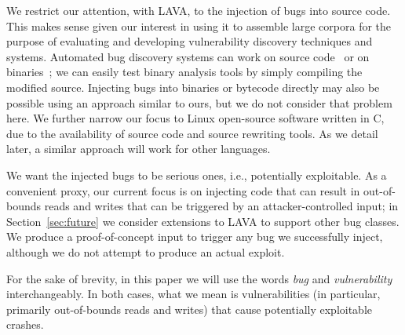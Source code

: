 
We restrict our attention, with LAVA, to the injection of bugs into source code.
This makes sense given our interest in using it to assemble large corpora for the purpose of evaluating and developing vulnerability discovery techniques and systems.
Automated bug discovery systems can work on source
code~\cite{Cadar:2008, Ganesh:2009, Haller:2013, Yamaguchi:2014} or on
binaries~\cite{Cha:2012, Wang:2010};
we can easily test binary analysis tools by simply compiling the modified source.
Injecting bugs into binaries or bytecode directly may also be possible using an approach similar to ours, but we do not consider that problem here.
We further narrow our focus to Linux open-source software written in C, due to the availability of source code and source rewriting tools.
As we detail later, a similar approach will work for other languages.

We want the injected bugs to be serious ones, i.e., potentially exploitable.
As a convenient proxy, our current focus is on injecting code that can result in out-of-bounds reads and writes that can be triggered by an attacker-controlled input; in Section~\ref{sec:future} we consider extensions to LAVA to support other bug classes.
We produce a proof-of-concept input to trigger any bug we successfully inject, although we do not attempt to produce an actual exploit.

For the sake of brevity, in this paper we will use the words \emph{bug} and \emph{vulnerability} interchangeably.
In both cases, what we mean is vulnerabilities (in particular, primarily out-of-bounds reads and writes) that cause potentially exploitable crashes.
